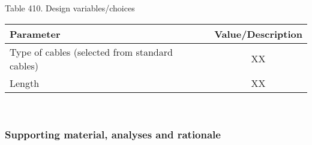 \begin{center}
Table 410. Design variables/choices\\
\begin{tabular}{ |l|c| } 
\hline
\textbf{Parameter} & \textbf{Value/Description}  \\ 
\hline
Type of cables (selected from standard cables) & XX  \\ 
\hline
Length & XX \\
\hline
\end{tabular} \\
\end{center}
\subsubsection{Supporting material, analyses and rationale}


